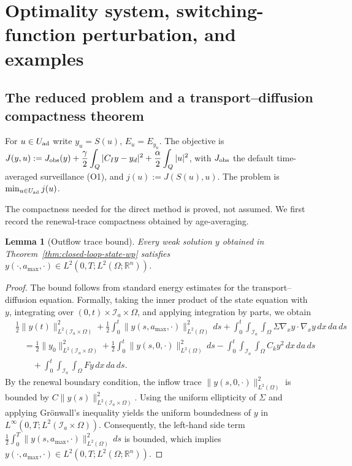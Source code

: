 \documentclass[pdflatex,sn-mathphys-num]{sn-jnl}
\theoremstyle{plain}
\newtheorem{lemma}[theorem]{Lemma}
\theoremstyle{definition}
\theoremstyle{remark}
\newcommand{\R}{\mathbb R}
\begin{document}
\section{Optimality system, switching-function perturbation, and examples}
\label{sec:optimality-switching-examples}

\subsection{The reduced problem and a transport--diffusion compactness theorem}
\label{subsec:reduced-ocp}
For $u\in U_{\rm ad}$ write $y_u=S(u)$, $E_u=E_{y_u}$. The objective is
$\displaystyle J(y,u)
:=
J_{\rm obs}(y)
+
\frac{\gamma}{2}
\int_Q|C_Iy-y_d|^2
+
\frac{\alpha}{2}
\int_Q|u|^2 $,
with $J_{\rm obs}$ the default time-averaged surveillance (O1), and
$j(u):=J(S(u),u)$. The problem is $\min_{u\in U_{\rm ad}}j(u)$.

The compactness needed for the direct method is proved, not assumed. We first
record the renewal-trace compactness obtained by age-averaging.

\begin{lemma}[Outflow trace bound]
\label{lem:outflow-trace}
Every weak solution \(y\) obtained in Theorem~\ref{thm:closed-loop-state-wp} satisfies
$\displaystyle y(\cdot, a_{\max}, \cdot) \in L^2(0,T; L^2(\Omega;\R^n))$.
\end{lemma}

\begin{proof}
The bound follows from standard energy estimates for the transport--diffusion equation. Formally, taking the inner product of the state equation with \(y\), integrating over \((0,t) \times \mathcal I_a \times \Omega\), and applying integration by parts, we obtain
\begin{align*}
&\frac{1}{2} \|y(t)\|_{L^2(\mathcal I_a\times\Omega)}^2 + \frac{1}{2} \int_0^t \|y(s, a_{\max}, \cdot)\|_{L^2(\Omega)}^2 \,ds 
+ \int_0^t \int_{\mathcal I_a} \int_\Omega \Sigma \nabla_x y \cdot \nabla_x y \,dx\,da\,ds \\
&\quad = \frac{1}{2} \|y_0\|_{L^2(\mathcal I_a\times\Omega)}^2 + \frac{1}{2} \int_0^t \|y(s, 0, \cdot)\|_{L^2(\Omega)}^2 \,ds 
- \int_0^t \int_{\mathcal I_a} \int_\Omega C_k y^2 \,dx\,da\,ds \\
&\qquad + \int_0^t \int_{\mathcal I_a} \int_\Omega F y \,dx\,da\,ds.
\end{align*}
By the renewal boundary condition, the inflow trace \(\|y(s, 0, \cdot)\|_{L^2(\Omega)}^2\) is bounded by \(C \|y(s)\|_{L^2(\mathcal I_a\times\Omega)}^2\). Using the uniform ellipticity of \(\Sigma\) and applying Gr\"onwall's inequality yields the uniform boundedness of \(y\) in \(L^\infty(0,T; L^2(\mathcal I_a\times\Omega))\). Consequently, the left-hand side term \(\frac{1}{2} \int_0^T \|y(s, a_{\max}, \cdot)\|_{L^2(\Omega)}^2 \,ds\) is bounded, which implies \(y(\cdot, a_{\max}, \cdot) \in L^2(0,T; L^2(\Omega;\R^n))\).
\end{proof}
\end{document}
